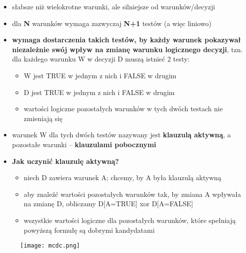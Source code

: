 \documentclass[../main.tex]{subfiles}
\begin{document}
    \begin{itemize}
        \item słabsze niż wielokrotne warunki, ale silniejsze od warunków/decyzji
        \item dla \textbf{N} warunków wymaga zazwyczaj \textbf{N+1} testów (a więc liniowo)
        \item \textbf{wymaga dostarczenia takich testów, by każdy warunek pokazywał niezależnie swój wpływ na zmianę warunku
        logicznego decyzji}, tzn. dla każdego warunku W w decyzji D muszą istnieć 2 testy:
        \begin{itemize}
            \item W jest TRUE w jednym z nich i FALSE w drugim
            \item D jest TRUE w jednym z nich i FALSE w drugim
            \item wartości logiczne pozostałych warunków w tych dwóch testach
            nie zmieniają się
        \end{itemize}
        \item warunek W dla tych dwóch testów nazywany jest \textbf{klauzulą aktywną},
        a pozostałe warunki – \textbf{klauzulami pobocznymi}
        \item \textbf{Jak uczynić klauzulę aktywną?}
        \begin{itemize}
            \item niech D zawiera warunek A; chcemy, by A była klauzulą aktywną
            \item aby znaleźć wartości pozostałych warunków tak, by zmiana A wpływała
            na zmianę D, obliczamy D[A=TRUE] xor D[A=FALSE]
            \item wszystkie wartości logiczne dla pozostałych warunków, które spełniają
            powyższą formułę są dobrymi kandydatami
        \end{itemize}
    \end{itemize}

    \begin{figure}[H]
        \texttt{[image: mcdc.png]}
    \end{figure}
\end{document}
